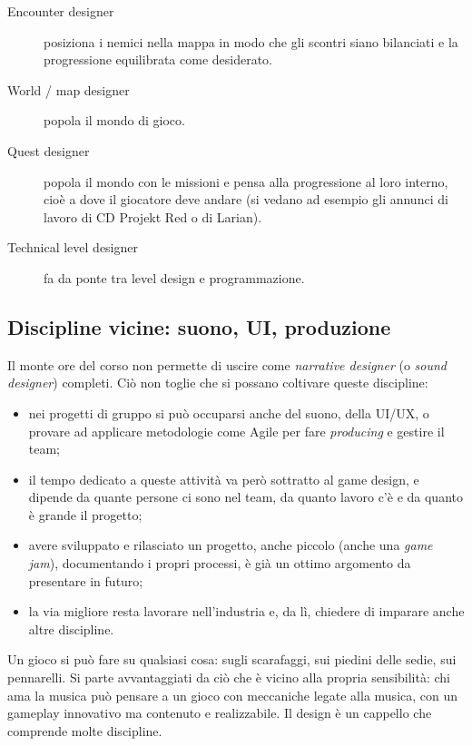 \begin{description}
  \item[Encounter designer] posiziona i nemici nella mappa in modo che gli
        scontri siano bilanciati e la progressione equilibrata come
        desiderato.
  \item[World / map designer] popola il mondo di gioco.
  \item[Quest designer] popola il mondo con le missioni e pensa alla
        progressione al loro interno, cioè a dove il giocatore deve andare (si
        vedano ad esempio gli annunci di lavoro di CD Projekt Red o di
        Larian).
  \item[Technical level designer] fa da ponte tra level design e
        programmazione.
\end{description}

\subsection{Discipline vicine: suono, UI, produzione}

Il monte ore del corso non permette di uscire come \emph{narrative designer}
(o \emph{sound designer}) completi. Ciò non toglie che si possano coltivare
queste discipline:
\begin{itemize}
  \item nei progetti di gruppo si può occuparsi anche del suono, della UI/UX,
        o provare ad applicare metodologie come Agile per fare
        \emph{producing} e gestire il team;
  \item il tempo dedicato a queste attività va però sottratto al game design,
        e dipende da quante persone ci sono nel team, da quanto lavoro c'è e
        da quanto è grande il progetto;
  \item avere sviluppato e rilasciato un progetto, anche piccolo (anche una
        \emph{game jam}), documentando i propri processi, è già un ottimo
        argomento da presentare in futuro;
  \item la via migliore resta lavorare nell'industria e, da lì, chiedere di
        imparare anche altre discipline.
\end{itemize}
Un gioco si può fare su qualsiasi cosa: sugli scarafaggi, sui piedini delle
sedie, sui pennarelli. Si parte avvantaggiati da ciò che è vicino alla propria
sensibilità: chi ama la musica può pensare a un gioco con meccaniche legate
alla musica, con un gameplay innovativo ma contenuto e realizzabile. Il design
è un cappello che comprende molte discipline.

